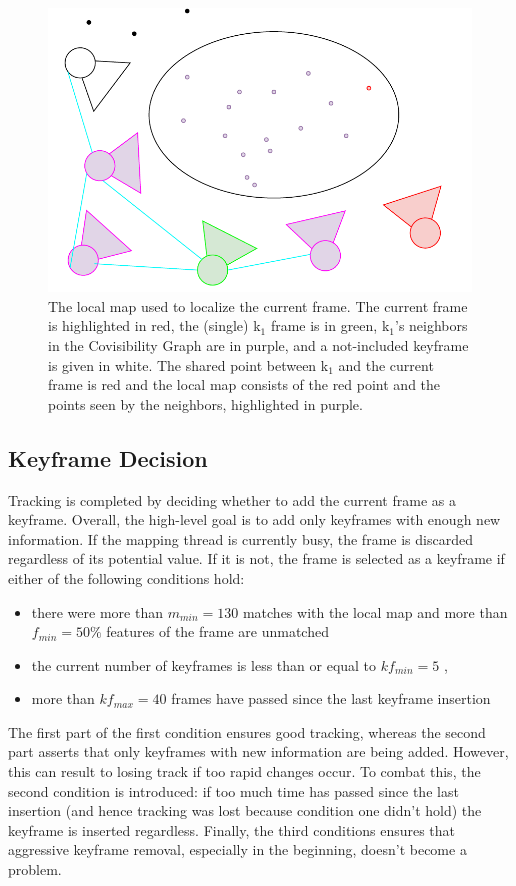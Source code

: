 \documentclass[a4paper, 10pt]{article}
\begin{document}
\begin{figure}[htbp]
\centering
\includegraphics[width=0.5\linewidth]{./resources/local-map.pdf}
\caption{\label{fig:orge481ec3}
The local map used to localize the current frame. The current frame is highlighted in red, the (single) k\(_{\text{1}}\) frame is in green, k\(_{\text{1}}\)'s neighbors in the Covisibility Graph are in purple, and a not-included keyframe is given in white. The shared point between k\(_{\text{1}}\) and the current frame is red and the local map consists of the red point and the points seen by the neighbors, highlighted in purple.}
\end{figure}

\subsection{Keyframe Decision}
\label{sec:org8c45fac}
Tracking is completed by deciding whether to add the current frame as a keyframe. Overall, the high-level goal is to add only keyframes with enough new information.
If the mapping thread is currently busy, the frame is discarded regardless of its potential value. If it is not, the frame is selected as a keyframe if either of the following conditions hold:
\begin{itemize}
\item there were more than \(m_{min}=130\) matches with the local map and more than \(f_{min}=50\%\) features of the frame are unmatched
\item the current number of keyframes is less than or equal to \(kf_{min}=5\) ,
\item more than \(kf_{max}=40\) frames have passed since the last keyframe insertion
\end{itemize}
The first part of the first condition ensures good tracking, whereas the second part asserts that only keyframes with new information are being added.
However, this can result to losing track if too rapid changes occur. To combat this, the second condition is introduced: if too much time has passed since the last insertion (and hence tracking was lost because condition one didn't
hold) the keyframe is inserted regardless. Finally, the third conditions ensures that aggressive keyframe removal, especially in the beginning, doesn't become a problem.
\end{document}
